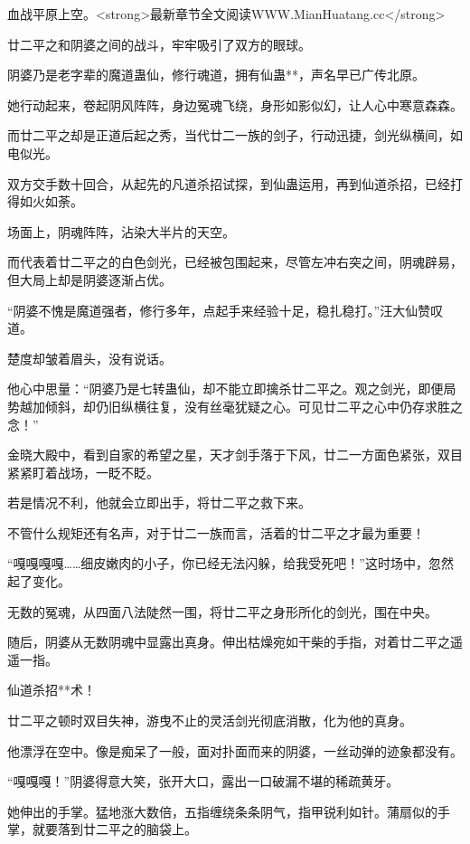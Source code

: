 
\begin{this_body}

血战平原上空。<strong>最新章节全文阅读WWW.MianHuatang.cc</strong>

廿二平之和阴婆之间的战斗，牢牢吸引了双方的眼球。

阴婆乃是老字辈的魔道蛊仙，修行魂道，拥有仙蛊**，声名早已广传北原。

她行动起来，卷起阴风阵阵，身边冤魂飞绕，身形如影似幻，让人心中寒意森森。

而廿二平之却是正道后起之秀，当代廿二一族的剑子，行动迅捷，剑光纵横间，如电似光。

双方交手数十回合，从起先的凡道杀招试探，到仙蛊运用，再到仙道杀招，已经打得如火如荼。

场面上，阴魂阵阵，沾染大半片的天空。

而代表着廿二平之的白色剑光，已经被包围起来，尽管左冲右突之间，阴魂辟易，但大局上却是阴婆逐渐占优。

“阴婆不愧是魔道强者，修行多年，点起手来经验十足，稳扎稳打。”汪大仙赞叹道。

楚度却皱着眉头，没有说话。

他心中思量：“阴婆乃是七转蛊仙，却不能立即擒杀廿二平之。观之剑光，即便局势越加倾斜，却仍旧纵横往复，没有丝毫犹疑之心。可见廿二平之心中仍存求胜之念！”

金晓大殿中，看到自家的希望之星，天才剑手落于下风，廿二一方面色紧张，双目紧紧盯着战场，一眨不眨。

若是情况不利，他就会立即出手，将廿二平之救下来。

不管什么规矩还有名声，对于廿二一族而言，活着的廿二平之才最为重要！

“嘎嘎嘎嘎……细皮嫩肉的小子，你已经无法闪躲，给我受死吧！”这时场中，忽然起了变化。

无数的冤魂，从四面八法陡然一围，将廿二平之身形所化的剑光，围在中央。

随后，阴婆从无数阴魂中显露出真身。伸出枯燥宛如干柴的手指，对着廿二平之遥遥一指。

仙道杀招**术！

廿二平之顿时双目失神，游曳不止的灵活剑光彻底消散，化为他的真身。

他漂浮在空中。像是痴呆了一般，面对扑面而来的阴婆，一丝动弹的迹象都没有。

“嘎嘎嘎！”阴婆得意大笑，张开大口，露出一口破漏不堪的稀疏黄牙。

她伸出的手掌。猛地涨大数倍，五指缠绕条条阴气，指甲锐利如针。蒲扇似的手掌，就要落到廿二平之的脑袋上。


\end{this_body}
